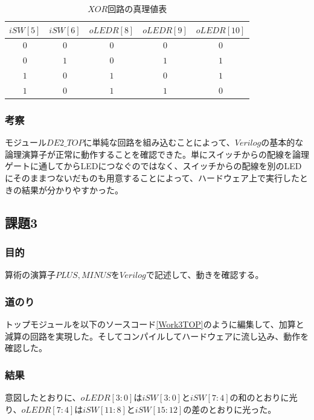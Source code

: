 \documentclass[a4paper]{jarticle}
\begin{document}
\begin{table}[H]
	\begin{center}
		\caption{$XOR$回路の真理値表}
		\label{Work2XorGateTruthTable}
		\begin{tabular}{|c|c|c|c|c|}
			\hline
			$iSW \left[ 5 \right]$	&$iSW \left[ 6 \right]$	&$oLEDR \left[ 8 \right]$	&$oLEDR \left[ 9 \right]$	&$oLEDR \left[ 10 \right]$\\	\hline\hline
			$0$			&$0$			&$0$				&$0$				&$0$\\				\hline
			$0$			&$1$			&$0$				&$1$				&$1$\\				\hline
			$1$			&$0$			&$1$				&$0$				&$1$\\				\hline
			$1$			&$0$			&$1$				&$1$				&$0$\\				\hline
		\end{tabular}
	\end{center}
\end{table}
\subsubsection{考察}
モジュール$DE2\_TOP$に単純な回路を組み込むことによって、$Verilog$の基本的な論理演算子が正常に動作することを確認できた。単にスイッチからの配線を論理ゲートに通してからLEDにつなぐのではなく、スイッチからの配線を別のLEDにそのままつないだものも用意することによって、ハードウェア上で実行したときの結果が分かりやすかった。
\subsection{課題3}
\subsubsection{目的}
算術の演算子$PLUS,MINUS$を$Verilog$で記述して、動きを確認する。
\subsubsection{道のり}
トップモジュールを以下のソースコード\ref{Work3TOP}のように編集して、加算と減算の回路を実現した。そしてコンパイルしてハードウェアに流し込み、動作を確認した。

\subsubsection{結果}
意図したとおりに、$oLEDR[3:0]$は$iSW[3:0]$と$iSW[7:4]$の和のとおりに光り、$oLEDR[7:4]$は$iSW[11:8]$と$iSW[15:12]$の差のとおりに光った。
\end{document}
